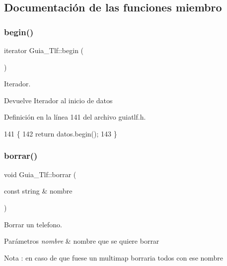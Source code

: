 \subsection{Documentación de las funciones miembro}
\mbox{\label{classGuia__Tlf_a0a0f50f45b96349e005d7457a0c05574}} 
\subsubsection{\texorpdfstring{begin()}{begin()}}
{\footnotesize\ttfamily iterator Guia\+\_\+\+Tlf\+::begin (\begin{DoxyParamCaption}{ }\end{DoxyParamCaption})\hspace{0.3cm}{\ttfamily [inline]}}



Iterador. 

\begin{DoxyReturn}{Devuelve}
Iterador al inicio de datos 
\end{DoxyReturn}


Definición en la línea 141 del archivo guiatlf.\+h.


\begin{DoxyCode}
141                     \{
142         \textcolor{keywordflow}{return} datos.begin();
143     \}
\end{DoxyCode}
\mbox{\label{classGuia__Tlf_a57e32bbc9e76567d22e5275d4d2a6515}} 
\subsubsection{\texorpdfstring{borrar()}{borrar()}\hspace{0.1cm}{\footnotesize\ttfamily [1/2]}}
{\footnotesize\ttfamily void Guia\+\_\+\+Tlf\+::borrar (\begin{DoxyParamCaption}\item[{const string \&}]{nombre }\end{DoxyParamCaption})}



Borrar un telefono. 


\begin{DoxyParams}{Parámetros}
{\em nombre} & nombre que se quiere borrar \\
\hline
\end{DoxyParams}
\begin{DoxyNote}{Nota}
\+: en caso de que fuese un multimap borraria todos con ese nombre 
\end{DoxyNote}


